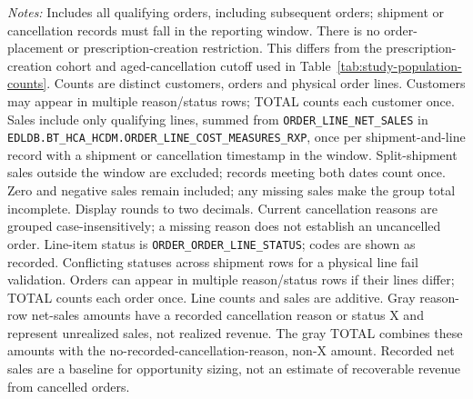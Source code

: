 \begin{table}[htbp]
\begin{minipage}{\linewidth}
\footnotesize
\textit{Notes:} Includes all qualifying orders, including subsequent orders;
shipment or cancellation records must fall in the reporting window. There is no order-placement or prescription-creation restriction.
This differs from the prescription-creation cohort and aged-cancellation cutoff
used in Table~\ref{tab:study-population-counts}.
Counts are distinct customers, orders and physical order lines. Customers may
appear in multiple reason/status rows; TOTAL counts each customer once. Sales include only
qualifying lines, summed from \texttt{ORDER\_LINE\_NET\_SALES} in
\texttt{EDLDB.BT\_HCA\_HCDM.ORDER\_LINE\_COST\_MEASURES\_RXP},
once per shipment-and-line record with a shipment or cancellation timestamp in the window. Split-shipment sales outside the window are excluded; records meeting both dates count once. Zero and negative sales remain included;
any missing sales make the group total incomplete. Display rounds to two
decimals. Current cancellation reasons are grouped
case-insensitively; a missing reason does not establish an uncancelled order.
Line-item status is \texttt{ORDER\_ORDER\_LINE\_STATUS}; codes are shown as recorded.
Conflicting statuses across shipment rows for a physical line fail validation.
Orders can appear in multiple reason/status rows if their lines differ;
TOTAL counts each order once. Line counts and sales are additive.
Gray reason-row net-sales amounts have a recorded cancellation reason or status X and represent
unrealized sales, not realized revenue. The gray TOTAL combines these amounts
with the no-recorded-cancellation-reason, non-X amount.
Recorded net sales are a baseline for opportunity sizing, not an estimate of
recoverable revenue from cancelled orders.
\end{minipage}
\end{table}







